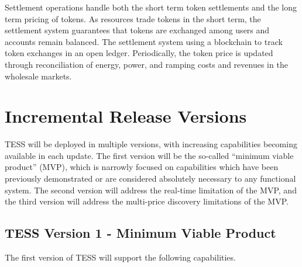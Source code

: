 Settlement operations handle both the short term token settlements and the long term pricing of tokens.  As resources trade tokens in the short term, the settlement system guarantees that tokens are exchanged among users and accounts remain balanced.  The settlement system using a blockchain to track token exchanges in an open ledger. Periodically, the token price is updated through reconciliation of energy, power, and ramping costs and revenues in the wholesale markets.

\section{Incremental Release Versions}

TESS will be deployed in multiple versions, with increasing capabilities becoming available in each update.  The first version will be the so-called ``minimum viable product'' (MVP), which is narrowly focused on capabilities which have been previously demonstrated or are considered absolutely necessary to any functional system.  The second version will address the real-time limitation of the MVP, and the third version will address the multi-price discovery limitations of the MVP.

\subsection{TESS Version 1 - Minimum Viable Product}

The first version of TESS will support the following capabilities.

